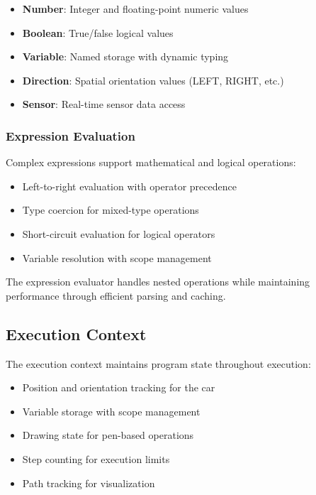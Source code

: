 \begin{itemize}
    \item \textbf{Number}: Integer and floating-point numeric values
    \item \textbf{Boolean}: True/false logical values
    \item \textbf{Variable}: Named storage with dynamic typing
    \item \textbf{Direction}: Spatial orientation values (LEFT, RIGHT, etc.)
    \item \textbf{Sensor}: Real-time sensor data access
\end{itemize}

\subsubsection{Expression Evaluation}

Complex expressions support mathematical and logical operations:

\begin{itemize}
    \item Left-to-right evaluation with operator precedence
    \item Type coercion for mixed-type operations
    \item Short-circuit evaluation for logical operators
    \item Variable resolution with scope management
\end{itemize}

The expression evaluator handles nested operations while maintaining performance through efficient parsing and caching.

\subsection{Execution Context}

The execution context maintains program state throughout execution:

\begin{itemize}
    \item Position and orientation tracking for the car
    \item Variable storage with scope management
    \item Drawing state for pen-based operations
    \item Step counting for execution limits
    \item Path tracking for visualization
\end{itemize}

